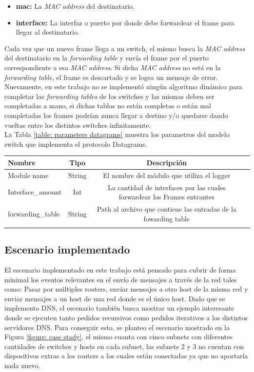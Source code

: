 \documentclass[10pt,a4paper]{article}
\begin{document}
\begin{itemize}
\item \textbf{mac: } La \textit{MAC address} del destinatario.
\item \textbf{interface: } La interfaz o puerto por donde debe forwardear el frame para llegar al destinatario.
\end{itemize}

Cada vez que un nuevo frame llega a un switch, el mismo busca la \textit{MAC address} del destinatario en la \textit{forwarding table} y envía el frame por el puerto correspondiente a esa \textit{MAC address}. Si dicha \textit{MAC address} no está en la \textit{forwarding table}, el frame es descartado y se logea un mensaje de error. \\

Nuevamente, en este trabajo no se implementó ningún algoritmo dinámico para completar las \textit{forwarding tables} de los switches y las mismas deben ser completadas a mano, si dichas tablas no están completas o están mal completadas los frames podrían nunca llegar a destino y/o quedarse dando vueltas entre los distintos switches infinitamente. \\

La Tabla \ref{table: parameters datagrams} muestra los parametros del modelo switch que implementa el protocolo Datagrams.

\begin{tabular}{|l|c|c|c|}
  \hline
  Nombre & Tipo & Descripción \\
  \hline
  Module name & String & El nombre del módulo que utiliza el logger \\
  \hline
  Interface_amount & Int & La cantidad de interfaces por las cuales forwardear los Frames entrantes \\
  \hline
  forwarding_table & String & Path al archivo que contiene las entradas de la fowarding table \\
  \hline
  \label{table: parameters datagrams}
  \caption{Parametros del modelo Switch}
\end{tabular}

\subsection{Escenario implementado}

El escenario implementado en este trabajo está pensado para cubrir de forma minimal los eventos relevantes en el envío de mensajes a través de la red tales como: Pasar por múltiples routers, enviar mensajes a otro host de la misma red y enviar mensajes a un host de una red donde es el único host. Dado que se implemento DNS, el escenario también busca mostrar un ejemplo interesante donde se ejecuten tanto pedidos recursivos como pedidos iterativos a los distintos servidores DNS. Para conseguir esto, se planteo el escenario mostrado en la Figura \ref{figure: case stady}, el mismo cuanta con cinco subnets con diferentes cantidades de switches y hosts en cada subnet, las subnets $2$ y $3$ no cuentan con dispositivos extras a los routers a los cuales están conectadas ya que no aportaría nada nuevo. \\
\end{document}
